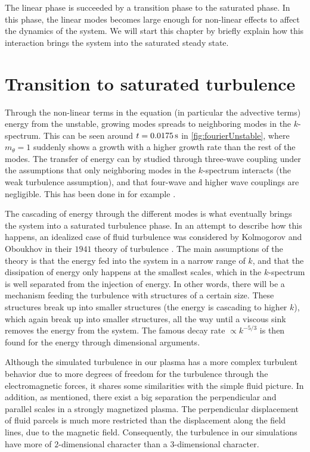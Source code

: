%
The linear phase is succeeded by a transition phase to the saturated phase.
In this phase, the linear modes becomes large enough for non-linear effects to affect the dynamics of the system.
We will start this chapter by briefly explain how this interaction brings the system into the saturated steady state.

\section{Transition to saturated turbulence}
Through the non-linear terms in the equation (in particular the advective terms) energy from the unstable, growing modes spreads to neighboring modes in the $k$-spectrum.
This can be seen around $t=0.0175\, \text{s}$ in \cref{fig:fourierUnstable}, where $m_\theta=1$ suddenly shows a growth with a higher growth rate than the rest of the modes.
The transfer of energy can by studied through three-wave coupling under the assumptions that only neighboring modes in the $k$-spectrum interacts (the weak turbulence assumption), and that four-wave and higher wave couplings are negligible.
This has been done in for example \cite{Ritz1989,Knorr1990}.

The cascading of energy through the different modes is what eventually brings the system into a saturated turbulence phase.
In an attempt to describe how this happens, an idealized case of fluid turbulence was considered by Kolmogorov and Oboukhov in their $1941$ theory of turbulence \cite{Kolmogorov1962}.
The main assumptions of the theory is that the energy fed into the system in a narrow range of $k$, and that the dissipation of energy only happens at the smallest scales, which in the $k$-spectrum is well separated from the injection of energy.
In other words, there will be a mechanism feeding the turbulence with structures of a certain size.
These structures break up into smaller structures (the energy is cascading to higher $k$), which again break up into smaller structures, all the way until a viscous sink removes the energy from the system.
The famous decay rate $\propto k^{-5/3}$ is then found for the energy through dimensional arguments.

Although the simulated turbulence in our plasma has a more complex turbulent behavior due to more degrees of freedom for the turbulence through the electromagnetic forces, it shares some similarities with the simple fluid picture.
In addition, as mentioned, there exist a big separation the perpendicular and parallel scales in a strongly magnetized plasma.
The perpendicular displacement of fluid parcels is much more restricted than the displacement along the field lines, due to the magnetic field.
Consequently, the turbulence in our simulations have more of $2$-dimensional character than a $3$-dimensional character.

